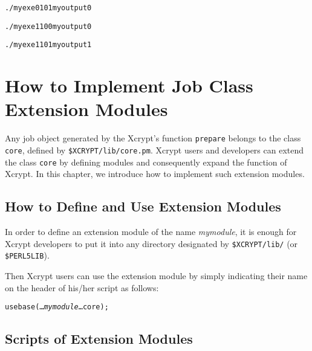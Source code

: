\documentclass[a4paper,10pt]{report}
\def\|{\verb|} %|
\begin{document}
\begin{boxnote}
\begin{alltt}
./myexe 0 101 myoutput0
\end{alltt}
\end{boxnote}

\begin{boxnote}
\begin{alltt}
./myexe 1 100 myoutput0
\end{alltt}
\end{boxnote}

\begin{boxnote}
\begin{alltt}
./myexe 1 101 myoutput1
\end{alltt}
\end{boxnote}

\chapter{How to Implement Job Class Extension Modules}

Any job object generated by the Xcrypt's function \|prepare| belongs
to the class \|core|, defined by \|$XCRYPT/lib/core.pm|.
Xcrypt users and developers can extend the class \|core| by defining
modules and consequently expand the function of Xcrypt.
In this chapter, we introduce how to implement such extension modules.

\section{How to Define and Use Extension Modules}

In order to define an extension module of the name \textit{mymodule},
it is enough for Xcrypt developers to put it into any directory
designated by \|$XCRYPT/lib/| (or \|$PERL5LIB|).

Then Xcrypt users can use the extension module by simply indicating
their name on the header of his/her script as follows:
\begin{screen}
\begin{alltt}
use base (\ldots {\it mymodule} \ldots core);
\end{alltt}
\end{screen}


\section{Scripts of Extension Modules}
\end{document}
